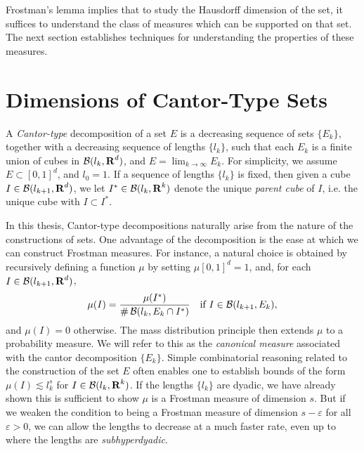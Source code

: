 Frostman's lemma implies that to study the Hausdorff dimension of the set, it suffices to understand the class of measures which can be supported on that set. The next section establishes techniques for understanding the properties of these measures.







\section{Dimensions of Cantor-Type Sets}

A \emph{Cantor-type} decomposition of a set $E$ is a decreasing sequence of sets $\{ E_k \}$, together with a decreasing sequence of lengths $\{ l_k \}$, such that each $E_k$ is a finite union of cubes in $\operatorname{\mathcal{B}}(l_k,\operatorname{\mathbf{R}}^d)$, and $E = \lim_{k \to \infty} E_k$. For simplicity, we assume $E \subset [0,1]^d$, and $l_0 = 1$. If a sequence of lengths $\{ l_k \}$ is fixed, then given a cube $I \in \operatorname{\mathcal{B}}(l_{k+1},\operatorname{\mathbf{R}}^d)$, we let $I^* \in \operatorname{\mathcal{B}}(l_k,\operatorname{\mathbf{R}}^k)$ denote the unique \emph{parent cube} of $I$, i.e. the unique cube with $I \subset I^*$.

In this thesis, Cantor-type decompositions naturally arise from the nature of the constructions of sets. One advantage of the decomposition is the ease at which we can construct Frostman measures. For instance, a natural choice is obtained by recursively defining a function $\mu$ by setting $\mu[0,1]^d = 1$, and, for each $I \in \operatorname{\mathcal{B}}(l_{k+1},\operatorname{\mathbf{R}}^d)$,
%
\[ \mu(I) = \frac{\mu(I^*)}{\# \operatorname{\mathcal{B}}(l_k,E_k \cap I^*)}\quad \text{if}\ I \in \operatorname{\mathcal{B}}(l_{k+1},E_k), \]
%
and $\mu(I) = 0$ otherwise. The mass distribution principle then extends $\mu$ to a probability measure. We will refer to this as the \emph{canonical measure} associated with the cantor decomposition $\{ E_k \}$. Simple combinatorial reasoning related to the construction of the set $E$ often enables one to establish bounds of the form $\mu(I) \lesssim l_k^s$ for $I \in \operatorname{\mathcal{B}}(l_k,\operatorname{\mathbf{R}}^k)$. If the lengths $\{ l_k \}$ are dyadic, we have already shown this is sufficient to show $\mu$ is a Frostman measure of dimension $s$. But if we weaken the condition to being a Frostman measure of dimension $s - \varepsilon$ for all $\varepsilon > 0$, we can allow the lengths to decrease at a much faster rate, even up to where the lengths are \emph{subhyperdyadic}.

